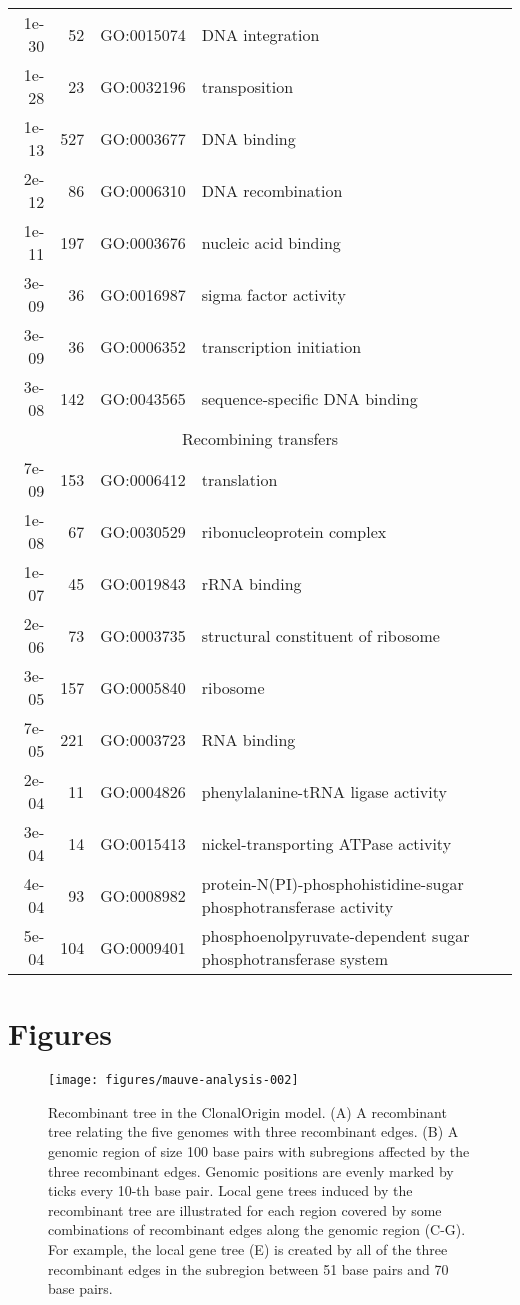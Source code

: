 \documentclass[english]{article}
\begin{document}
\begin{table}
\begin{tabular}{rrll}
1e-30 &  52 & GO:0015074 & DNA integration\\
1e-28 &  23 & GO:0032196 & transposition\\
1e-13 & 527 & GO:0003677 & DNA binding\\
2e-12 &  86 & GO:0006310 & DNA recombination\\
1e-11 & 197 & GO:0003676 & nucleic acid binding\\
3e-09 &  36 & GO:0016987 & sigma factor activity\\
3e-09 &  36 & GO:0006352 & transcription initiation\\
3e-08 & 142 & GO:0043565 & sequence-specific DNA binding\\
\hline
\hline
\multicolumn{4}{c}{Recombining transfers} \\
\hline
7e-09 & 153 & GO:0006412 & translation\\
1e-08 &  67 & GO:0030529 & ribonucleoprotein complex\\
1e-07 &  45 & GO:0019843 & rRNA binding\\
2e-06 &  73 & GO:0003735 & structural constituent of ribosome\\
3e-05 & 157 & GO:0005840 & ribosome\\
7e-05 & 221 & GO:0003723 & RNA binding\\
2e-04 &  11 & GO:0004826 & phenylalanine-tRNA ligase activity\\
3e-04 &  14 & GO:0015413 & nickel-transporting ATPase activity\\
4e-04 &  93 & GO:0008982 & protein-N(PI)-phosphohistidine-sugar phosphotransferase activity\\
5e-04 & 104 & GO:0009401 & phosphoenolpyruvate-dependent sugar phosphotransferase system\\
\end{tabular}

\end{table}



\clearpage{}


\section*{Figures\clearpage{}}

\begin{figure}
\texttt{[image: figures/mauve-analysis-002]}
\caption{\label{fig:clonalorigin}Recombinant tree in the ClonalOrigin model.
(A) A recombinant tree relating the five genomes with three recombinant edges.
(B) A genomic region of size 100 base pairs with subregions affected by the
three recombinant edges. Genomic positions are evenly marked by ticks every 
10-th base pair. Local gene trees induced by the recombinant tree are
illustrated for each region covered by some combinations of recombinant edges
along the genomic region (C-G). For example, the local gene tree (E) is created
by all of the three recombinant edges in the subregion between 51 base pairs
and 70 base pairs.}
\end{figure}
\clearpage{}
\end{document}
